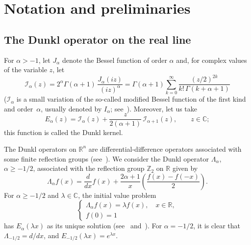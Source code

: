 \documentclass[12pt,a4paper]{amsart}
\theoremstyle{plain}
\theoremstyle{definition}
\newcommand{\Z}{\mathbb{Z}}
\newcommand{\R}{\mathbb{R}}
\newcommand{\C}{\mathbb{C}}
\newcommand{\calI}{\mathcal{I}}
\begin{document}
\section{Notation and preliminaries}
\label{sec:prelim}

\subsection{The Dunkl operator on the real line}

For $\alpha > -1$, let $J_\alpha$ denote the Bessel function of order $\alpha$ and,
for complex values of the variable $z$, let
\begin{equation*}
  \calI_\alpha(z)
  = 2^\alpha \Gamma(\alpha+1)\, \frac{J_\alpha(iz)}{(iz)^\alpha}
  = \Gamma(\alpha+1) \sum_{k=0}^\infty \frac{(z/2)^{2k}}{k!\,\Gamma(k+\alpha+1)}
\end{equation*}
($\calI_\alpha$ is a small variation of the so-called modified
Bessel function of the first kind and order~$\alpha$, usually
denoted by $I_\alpha$; see~\cite{Wat}). Moreover, let us take
\begin{equation*}
  E_\alpha(z) = \calI_\alpha(z) + \frac{z}{2(\alpha+1)}\,
    \calI_{\alpha+1}(z),
  \qquad z \in \C;
\end{equation*}
this function is called the Dunkl kernel.

The Dunkl operators on $\R^n$ are differential-difference operators
associated with some finite reflection groups (see~\cite{Dunkl}). We
consider the Dunkl operator $\Lambda_\alpha$, $\alpha \ge -1/2$, associated
with the reflection group $\Z_2$ on $\R$ given by
\begin{equation}
\label{eq:dunkloper}
  \Lambda_\alpha f(x) = \frac{d}{dx}f(x) + \frac{2\alpha+1}{x}
  \left(\frac{f(x)-f(-x)}{2}\right).
\end{equation}
For $\alpha \ge -1/2$ and $\lambda\in \C$, the initial value problem
\begin{equation}
\label{eq:dunklproblem}
\begin{cases}
  \Lambda_\alpha f(x) = \lambda f(x),\quad x\in \R, \\
  f(0) = 1
\end{cases}
\end{equation}
has $E_\alpha(\lambda x)$ as its unique solution (see~\cite{Dunkl2}
and~\cite{Jeu}). For $\alpha = -1/2$, it is
clear that $\Lambda_{-1/2} = d/dx$, and $E_{-1/2}(\lambda x) = e^{\lambda x}$.
\end{document}
